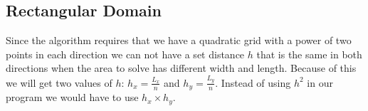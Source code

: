 \documentclass[a4paper, 12pt]{article}
\begin{document}
	\subsection{Rectangular Domain}
	Since the algorithm requires that we have a quadratic grid with a power of two points in each direction we can not have a set distance $h$ that is the same in both directions when the area to solve has different width and length. Because of this we will get two values of $h$: $h_x = \frac{L_x}{n}$ and $h_y = \frac{L_y}{n}$. Instead of using $h^2$ in our program we would have to use $h_x\times h_y$.
    
\end{document}
